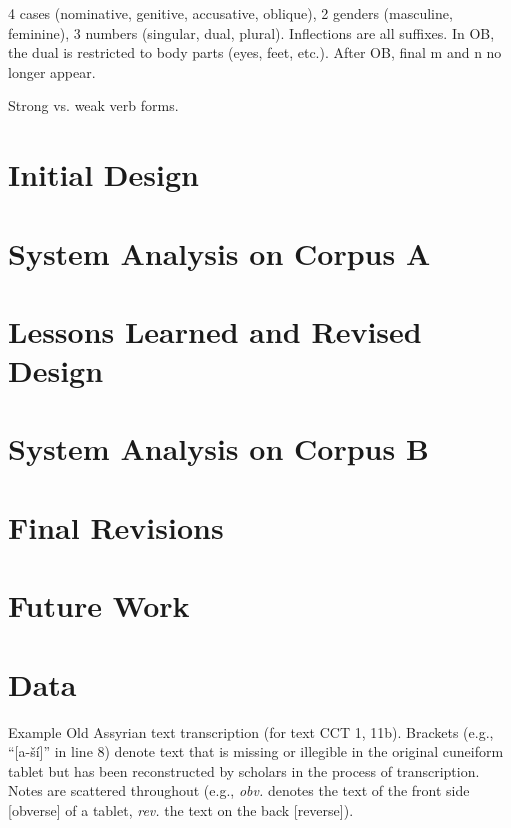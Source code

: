 \documentclass[11pt,letterpaper]{article}
\begin{document}
4 cases (nominative, genitive, accusative, oblique), 2 genders (masculine, feminine), 3 numbers (singular, dual, plural).  Inflections are all suffixes.  In OB, the dual is restricted to body parts (eyes, feet, etc.).  After OB, final m and n no longer appear.

Strong vs. weak verb forms.

\section{Initial Design}

\section{System Analysis on Corpus A}

\section{Lessons Learned and Revised Design}

\section{System Analysis on Corpus B}

\section{Final Revisions}

\section{Future Work}

\appendix
\section{Data}
\label{appendixData}
Example Old Assyrian text transcription (for text CCT 1, 11b). Brackets (e.g., ``[a-ší]'' in line 8) denote text that is missing or illegible in the original cuneiform tablet but has been reconstructed by scholars in the process of transcription.  Notes are scattered throughout (e.g., \emph{obv.} denotes the text of the front side [obverse] of a tablet, \emph{rev.} the text on the back [reverse]).
\end{document}
